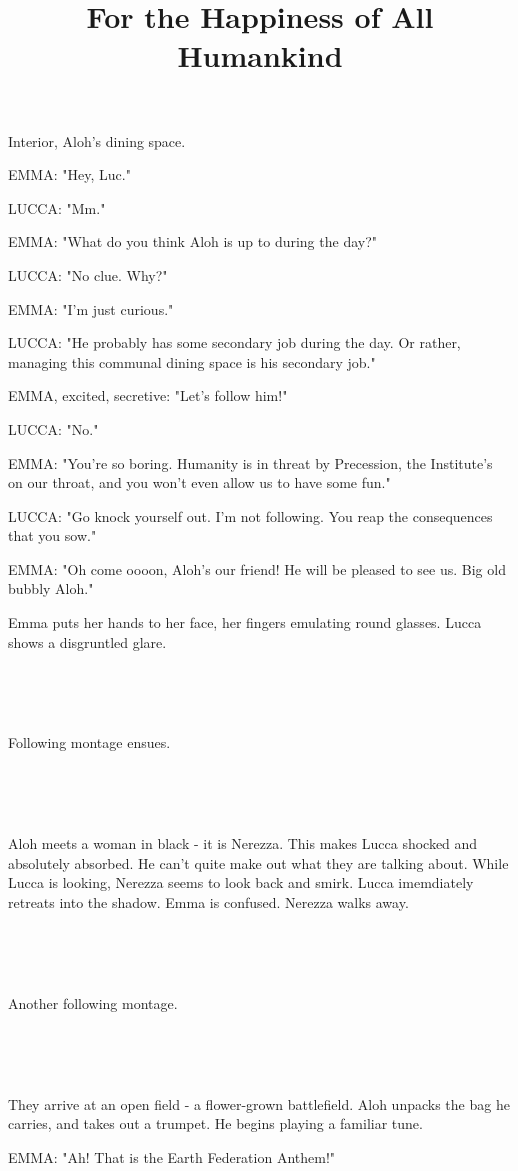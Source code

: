 \documentclass[11pt]{article}
\begin{document}
\ttfamily
\title{For the Happiness of All Humankind}
\maketitle

Interior, Aloh's dining space.

EMMA: "Hey, Luc."

LUCCA: "Mm."

EMMA: "What do you think Aloh is up to during the day?"

LUCCA: "No clue. Why?"

EMMA: "I'm just curious."

LUCCA: "He probably has some secondary job during the day.
Or rather, managing this communal dining space is his secondary job."

EMMA, excited, secretive: "Let's follow him!"

LUCCA: "No."

EMMA: "You're so boring.
Humanity is in threat by Precession, the Institute's on our throat, and you won't even allow us to have some fun."

LUCCA: "Go knock yourself out. 
I'm not following.
You reap the consequences that you sow."

EMMA: "Oh come oooon, Aloh's our friend!
He will be pleased to see us.
Big old bubbly Aloh."

Emma puts her hands to her face, her fingers emulating round glasses.
Lucca shows a disgruntled glare.

\ 

\ 

Following montage ensues.

\ 

\ 

Aloh meets a woman in black - it is Nerezza.
This makes Lucca shocked and absolutely absorbed.
He can't quite make out what they are talking about.
While Lucca is looking, Nerezza seems to look back and smirk.
Lucca imemdiately retreats into the shadow.
Emma is confused.
Nerezza walks away.

\ 

\ 

Another following montage.

\ 

\ 

They arrive at an open field - a flower-grown battlefield.
Aloh unpacks the bag he carries, and takes out a trumpet. 
He begins playing a familiar tune.

EMMA: "Ah! That is the Earth Federation Anthem!"
\end{document}

